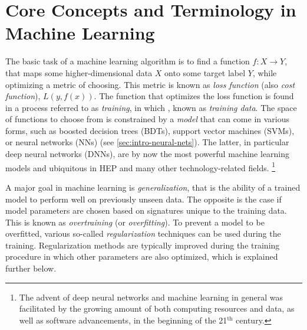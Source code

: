 \section{Core Concepts and Terminology in Machine Learning}
The basic task of a machine learning algorithm is to find a function $f: X \rightarrow Y$, that maps some higher-dimensional data $X$ onto some target label $Y$, while optimizing a metric of choosing.
This metric is known as \emph{loss function} (also \emph{cost function}), $L(y, f(x))$.
The function that optimizes the loss function is found in a process referred to as \emph{training}, in which , known as \emph{training data}.
The space of functions to choose from is constrained by a \emph{model} that can come in various forms, such as boosted decision trees (BDTs), support vector machines (SVMs), or neural networks (NNs) (see \cref{sec:intro-neural-nets}). The latter, in particular deep neural networks (DNNs), are by now the most powerful machine learning models and ubiquitous in HEP and many other technology-related fields.  \footnote{The advent of deep neural networks and machine learning in general was facilitated by the growing amount of both computing resources and data, as well as software advancements, in the beginning of the 21$^{\text{th}}$ century.}



A major goal in machine learning is \emph{generalization}, that is the ability of a trained model to perform well on previously unseen data.
The opposite is the case if model parameters are chosen based on signatures unique to the training data. This is known as \emph{overtraining} (or \emph{overfitting}). To prevent a model to be overfitted, various so-called \emph{regularization} techniques can be used during the training.
Regularization methods are typically improved during the training procedure in which other parameters are also optimized, which is explained further below.


